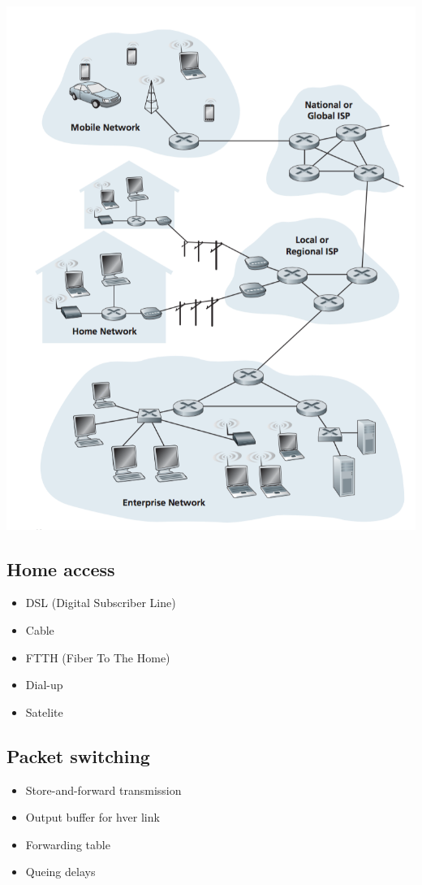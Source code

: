 {\includegraphics[scale=0.5]{1-networks/internet.png}

\subsection{Home access}
\begin{itemize}
	\item DSL (Digital Subscriber Line)
	\item Cable
	\item FTTH (Fiber To The Home)
	\item Dial-up
	\item Satelite
\end{itemize}

\subsection{Packet switching}
\begin{itemize}
	\item Store-and-forward transmission
	\item Output buffer for hver link
	\item Forwarding table
	\item Queing delays
\end{itemize}

}
